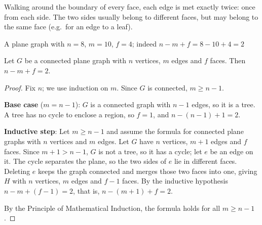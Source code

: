 \begin{note}
Walking around the boundary of every face, each edge is met exactly twice: once from each side. The two sides usually belong to different faces, but may belong to the same face (e.g.\ for an edge to a leaf).
\end{note}

\begin{center}
\end{center}
\begin{center}
\small A plane graph with $n=8$, $m=10$, $f=4$; indeed $n-m+f=8-10+4=2$
\end{center}

\bigskip
\begin{theorem}
Let $G$ be a connected plane graph with $n$ vertices, $m$ edges and $f$ faces. Then $n-m+f = 2$.
\end{theorem}
\begin{proof}
Fix $n$; we use induction on $m$. Since $G$ is connected, $m\ge n-1$.

\textbf{Base case} ($m=n-1$): $G$ is a connected graph with $n-1$ edges, so it is a tree. A tree has no cycle to enclose a region, so $f=1$, and $n-(n-1)+1=2$.

\textbf{Inductive step}: Let $m\ge n-1$ and assume the formula for connected plane graphs with $n$ vertices and $m$ edges. Let $G$ have $n$ vertices, $m+1$ edges and $f$ faces. Since $m+1>n-1$, $G$ is not a tree, so it has a cycle; let $e$ be an edge on it. The cycle separates the plane, so the two sides of $e$ lie in different faces. Deleting $e$ keeps the graph connected and merges those two faces into one, giving $H$ with $n$ vertices, $m$ edges and $f-1$ faces. By the inductive hypothesis $n-m+(f-1)=2$, that is, $n-(m+1)+f=2$.

By the Principle of Mathematical Induction, the formula holds for all $m\ge n-1$.
\end{proof}


